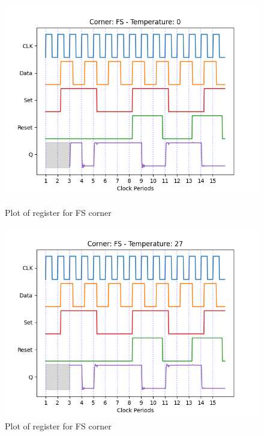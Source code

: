 \begin{figure}[H]
    \begin{minipage}{0.5\textwidth}
        \centering
        \includegraphics[width=\textwidth]{Figures/Aimspice_Plots/FS_0.png}
        \caption{Plot of register for FS corner}
        \label{fig:FS0}
    \end{minipage}%
    \begin{minipage}{0.5\textwidth}
        \centering
        \includegraphics[width=\textwidth]{Figures/Aimspice_Plots/FS_27.png}
        \caption{Plot of register for FS corner}
        \label{fig:FS27}
    \end{minipage}
\end{figure}
